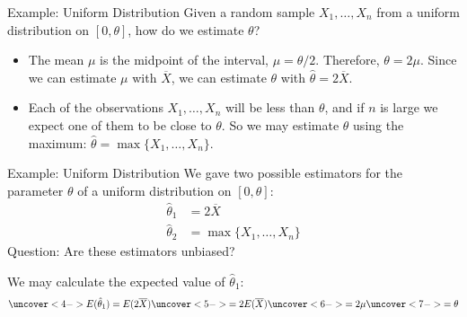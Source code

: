 \documentclass[handout]{beamer}
\begin{document}
\begin{frame}{Example: Uniform Distribution}
Given a random sample $X_1,\dots,X_n$ from a uniform distribution on $[0,\theta]$, how do we estimate $\theta$?

\begin{itemize}
\pause\item The mean $\mu$ is the midpoint of the interval, $\mu=\theta/2$. Therefore, $\theta=2\mu$. Since we can estimate $\mu$ with $\overline{X}$, we can estimate $\theta$ with $\hat\theta = 2\overline{X}$.
\pause\item Each of the observations $X_1,\dots,X_n$ will be less than $\theta$, and if $n$ is large we expect one of them to be close to $\theta$. So we may estimate $\theta$ using the maximum: $\hat\theta = \max\{X_1,\dots,X_n\}$.
\end{itemize}
\end{frame}

\begin{frame}{Example: Uniform Distribution}
We gave two possible estimators for the parameter $\theta$ of a uniform distribution on $[0,\theta]$:
\begin{align*}
\hat\theta_1 &= 2\overline{X} \\
\hat\theta_2 &= \max\{X_1,\dots,X_n\}
\end{align*}
\pause Question: Are these estimators unbiased?

\vspace{.2cm}
\pause We may calculate the expected value of $\hat\theta_1$:
 \begin{align*}
\uncover<4->{E(\hat\theta_1) = E(2\overline{X})}
\uncover<5->{= 2E(\overline{X}) }
\uncover<6->{= 2\mu }
\uncover<7->{= \theta}
\end{align*}
\end{frame}
\end{document}
